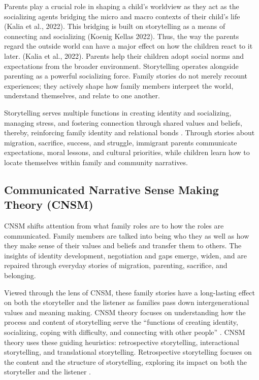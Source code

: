 Parents play a crucial role in shaping a child's worldview as they act as the socializing agents bridging the micro and macro contexts of their child's life (Kalia et al., 2022). This bridging is built on storytelling as a means of connecting and socializing (Koenig Kellas 2022).  Thus, the way the parents regard the outside world can have a major effect on how the children react to it later.  (Kalia et al., 2022). Parents help their children adopt social norms and expectations from the broader environment. Storytelling operates alongside parenting as a powerful socializing force. Family stories do not merely recount experiences; they actively shape how family members interpret the world, understand themselves, and relate to one another.

Storytelling serves multiple functions in creating identity and socializing, managing stress, and fostering connection through shared values and beliefs, thereby, reinforcing family identity and relational bonds \citep{koenigkellasCommunicatedNarrativeSenseMaking2022, koenigkellasFamilyStoriesStorytelling2012}. Through stories about migration, sacrifice, success, and struggle, immigrant parents communicate expectations, moral lessons, and cultural priorities, while children learn how to locate themselves within family and community narratives.

\subsection{Communicated Narrative Sense Making Theory (CNSM)}

CNSM shifts attention from what family roles are to how the roles are communicated. Family members are talked into being who they as well as how they make sense of their values and beliefs and transfer them to others. The insights of identity development, negotiation and gaps emerge, widen, and are repaired through everyday stories of migration, parenting, sacrifice, and belonging.

Viewed through the lens of CNSM, these family stories have a long-lasting effect on both the storyteller and the listener as families pass down intergenerational values and meaning making. CNSM theory focuses on understanding how the process and content of storytelling serve the ``functions of creating identity, socializing, coping with difficulty, and connecting with other people'' \citep[p.~118]{koenigkellasCommunicatedNarrativeSenseMaking2022}. CNSM theory uses these guiding heuristics: retrospective storytelling, interactional storytelling, and translational storytelling. Retrospective storytelling focuses on the content and the structure of storytelling, exploring its impact on both the storyteller and the listener \citep{koenigkellasCommunicatedNarrativeSenseMaking2022, koenigkellasFamilyStoriesStorytelling2012}. 

